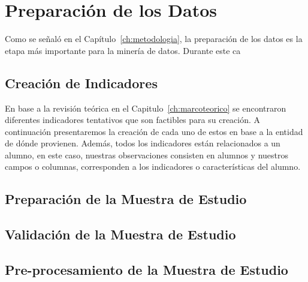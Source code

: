 \section{Preparación de los Datos}
Como se señaló en el Capítulo~\ref{ch:metodologia}, la preparación de los datos es la etapa más importante para la minería de datos. Durante este ca
\subsection{Creación de Indicadores}
En base a la revisión teórica en el Capitulo~\ref{ch:marcoteorico} se encontraron diferentes indicadores tentativos que son factibles para su creación.
A continuación presentaremos la creación de cada uno de estos en base a la entidad de dónde provienen. Además, todos los indicadores están relacionados a un alumno, en este caso, nuestras observaciones consisten en alumnos y nuestros campos o columnas, corresponden a los indicadores o características del alumno.
\subsection{Preparación de la Muestra de Estudio}
\subsection{Validación de la Muestra de Estudio}
\subsection{Pre-procesamiento de la Muestra de Estudio}



